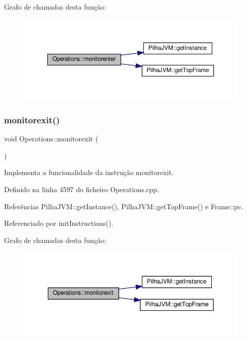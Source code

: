 Grafo de chamadas desta função\+:
\nopagebreak
\begin{figure}[H]
\begin{center}
\leavevmode
\includegraphics[width=350pt]{classOperations_a4d62d66d9e60667ed4e689cd6a44ecaa_cgraph}
\end{center}
\end{figure}
\mbox{\label{classOperations_af3fc8364ad200be676ea35e4b918e8e6}} 
\subsubsection{\texorpdfstring{monitorexit()}{monitorexit()}}
{\footnotesize\ttfamily void Operations\+::monitorexit (\begin{DoxyParamCaption}{ }\end{DoxyParamCaption})\hspace{0.3cm}{\ttfamily [private]}}



Implementa a funcionalidade da instrução monitorexit. 



Definido na linha 4597 do ficheiro Operations.\+cpp.



Referências Pilha\+J\+V\+M\+::get\+Instance(), Pilha\+J\+V\+M\+::get\+Top\+Frame() e Frame\+::pc.



Referenciado por init\+Instructions().

Grafo de chamadas desta função\+:
\nopagebreak
\begin{figure}[H]
\begin{center}
\leavevmode
\includegraphics[width=350pt]{classOperations_af3fc8364ad200be676ea35e4b918e8e6_cgraph}
\end{center}
\end{figure}
\mbox{\label{classOperations_a78c45edfcdf63668974ffc3b2d84a309}} 
